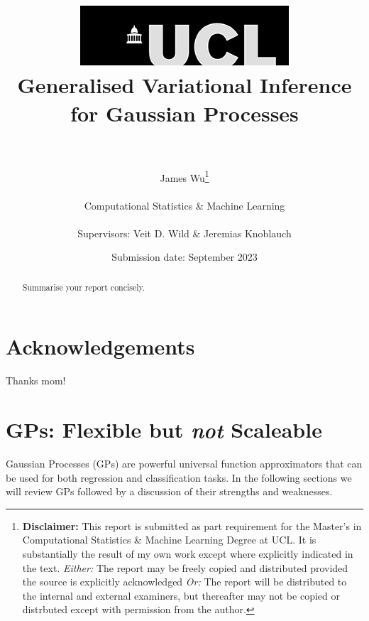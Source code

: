 \documentclass{article}
\title{  	{ \includegraphics[scale=.5]{ucl_logo.png}}\\
{{\Huge Generalised Variational Inference for Gaussian Processes}}\\
{\large }\\
		}
\date{Submission date: September 2023}
\author{James Wu\thanks{
{\bf Disclaimer:}
This report is submitted as part requirement for the Master's in Computational Statistics \& Machine Learning Degree at UCL. It is
substantially the result of my own work except where explicitly indicated in the text.
\newline  %
\emph{Either: }The report may be freely copied and distributed provided the source is explicitly acknowledged
\newline  %
\emph{Or: }The report will be distributed to the internal and external examiners, but thereafter may not be copied or distrbuted except with permission from the author.}
\\ \\
Computational Statistics \& Machine Learning\\ \\
Supervisors: Veit D. Wild \& Jeremias Knoblauch}
\numberwithin{equation}{section}
\begin{document}
\onehalfspacing
\maketitle
{}
\newpage
\setcounter{page}{1}
\section*{Acknowledgements}
Thanks mom!
\newpage

\begin{abstract}
Summarise your report concisely.
\end{abstract}
\newpage
\tableofcontents
\newpage
{}
\setcounter{page}{1}
\section{GPs: Flexible but \textit{not} Scaleable}
Gaussian Processes (GPs) are powerful universal function approximators that can be used for both regression and classification tasks. In the following sections we will review GPs followed by a discussion of their strengths and weaknesses.
\end{document}

